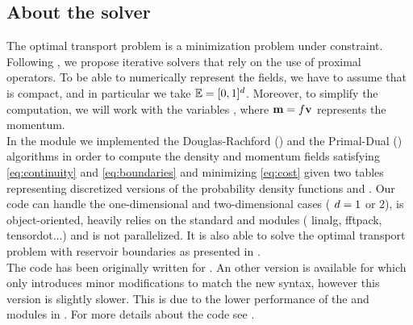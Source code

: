     \subsection{About the solver}
    \noindent

        The optimal transport problem is a minimization problem under constraint. Following \cite{papadakis-2014}, we propose iterative
        solvers that rely on the use of proximal operators. To be able to numerically represent the fields, we have to assume that
        \spaceE{} is compact, and in particular we take $\mathbb{E}=[0,1]^{d}$. Moreover, to simplify the computation, we will work with
        the variables \coupleFM{}, where $\mathbf{m}=f\mathbf{v}$ represents the momentum.\\

        In the \python module we implemented the Douglas-Rachford (\drAlgo{}) and the Primal-Dual (\pdAlgo{}) algorithms in order to compute the density
        and momentum fields satisfying \eqref{eq:continuity} and \eqref{eq:boundaries} and minimizing \eqref{eq:cost}
        given two tables representing discretized versions of
        the probability density functions \fI{} and \fII{}. Our \python code can handle the one-dimensional and two-dimensional cases
        (\ie{} $d=1$ or $2$), is object-oriented, heavily relies on the standard \numpy{} and \scipy{} modules 
        (\eg{} linalg, fftpack, tensordot...) and is not parallelized. It is also able to solve the optimal transport
        problem with reservoir boundaries as presented in \cite{farchi-2016}.\\

        The code has been originally written for . An other version is available for  which only
        introduces minor modifications to match the new  syntax, however this version is slightly slower. This is due to the
        lower performance of the \numpy{} and \scipy{} modules in .
        For more details about the code see \cite{farchi-2016}.

